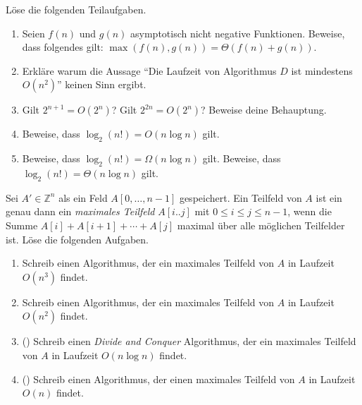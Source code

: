 \documentclass{uebung_cs}
\begin{document}
\begin{aufgabe}
	Löse die folgenden Teilaufgaben.
	\begin{enumerate}
		\item \bestehen Seien $f(n)$ und $g(n)$ asymptotisch nicht negative Funktionen.
		Beweise, dass folgendes gilt: $\max(f(n),g(n)) = \Theta(f(n) + g(n))$.
		\item \bestehen Erkläre warum die Aussage \enquote{Die Laufzeit von Algorithmus $D$ ist mindestens $O(n^2)$} keinen Sinn ergibt.
		\item \bestehen Gilt $2^{n+1} = O(2^n)$? Gilt $2^{2n} = O(2^n)$? Beweise deine Behauptung.
		\item \mittel Beweise, dass $\log_2(n!) = O(n \log n)$ gilt.
		\item \note %
    Beweise, dass $\log_2(n!) = \Omega(n\log n)$ gilt.
		Beweise, dass $\log_2(n!) = \Theta(n\log n)$ gilt.
	\end{enumerate}
\end{aufgabe}

\begin{aufgabe}
	Sei $A' \in \mathbb{Z}^n$ als ein Feld $A[0, \dots, n-1]$ gespeichert.
	Ein Teilfeld von $A$ ist ein genau dann ein \textit{maximales Teilfeld} $A[i..j]$ mit $0\leq i\leq j\leq n-1$, wenn die Summe $A[i] + A[i+1] + \cdots + A[j]$ maximal über alle möglichen Teilfelder ist.
	Löse die folgenden Aufgaben.
	\begin{enumerate}
		\item \bestehen %
    Schreib einen Algorithmus, der ein maximales Teilfeld von $A$ in Laufzeit $O(n^3)$ findet.
		\item \bestehen Schreib einen Algorithmus, der ein maximales Teilfeld von $A$ in Laufzeit $O(n^2)$ findet.
		\item \mittel (\hard) Schreib einen \textit{Divide and Conquer} Algorithmus, der ein maximales Teilfeld von $A$ in Laufzeit $O(n\log n)$ findet.
		\item \note (\veryhard) Schreib einen Algorithmus, der einen maximales Teilfeld von $A$ in Laufzeit $O(n)$ findet.
	\end{enumerate}
\end{aufgabe}
\end{document}
